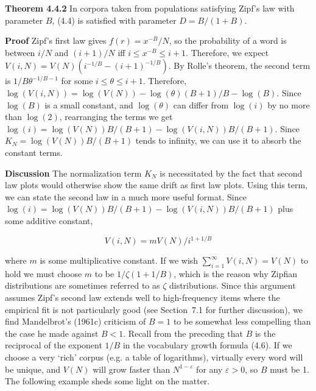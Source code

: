 \noindent
{\bf Theorem 4.4.2} In corpora taken from populations satisfying Zipf's law
with parameter $B$, (4.4) is satisfied with parameter $D=B/(1+B)$.

\smallskip
\noindent
{\bf Proof} Zipf's first law gives $f(r)=x^{-B}/N$, so the probability of a
word is between $i/N$ and $(i+1)/N$ iff $i \leq x^{-B} \leq i+1$. Therefore, we
expect $V(i,N) = V(N)(i^{-1/B } - (i+1)^{-1/B })$. By Rolle's theorem, the
second term is $1/B \theta^{-1/B -1}$ for some $i \leq \theta \leq
i+1$. Therefore, $\log(V(i,N)) = \log(V(N)) - \log(\theta)(B+1)/B -\log(B)$.
Since $\log(B)$ is a small constant, and $\log(\theta)$ can differ from
$\log(i)$ by no more than $\log(2)$, rearranging the terms we get $ \log(i) =
\log(V(N)) B/(B+1) - \log(V(i,N)) B/(B +1)$. Since $K_N = \log(V(N))B/(B+1)$
tends to infinity, we can use it to absorb the constant terms.

\smallskip
\noindent
{\bf Discussion} The normalization term $K_N$ is necessitated by the fact that
second law plots would otherwise show the same drift as first law plots. Using
this term, we can state the second law in a much more useful format. Since
$\log(i) = \log(V(N)) B/(B +1) - \log(V(i,N)) B/(B +1)$ plus some additive
constant,

\begin{equation} %
V(i,N) = mV(N)/i^{1+1/B}
\end{equation}

\noindent
where $m$ is some multiplicative constant.  If we wish $\sum_{i=1}^{\infty}
V(i,N) = V(N)$ to hold we must choose $m$ to be $1/\zeta(1+1/B)$, which is
the reason why Zipfian distributions are sometimes referred to as $\zeta$
distributions. Since this argument assumes Zipf's second law extends well to
high-frequency items where the empirical fit is not particularly good (see
Section~7.1 for further discussion), we find Mandelbrot's (1961c)
\nocite{Mandelbrot:1961} criticism of $B=1$ to be somewhat less compelling
than the case he made against $B<1$.  Recall from the preceding that $B$ is
the reciprocal of the exponent $1/B $ in the vocabulary growth formula
(4.6). If we choose a very `rich' corpus (e.g. a table of logarithms),
virtually every word will be unique, and $V(N)$ will grow faster than
$N^{1-\varepsilon}$ for any $\varepsilon > 0$, so $B$ must be 1. The following
example sheds some light on the matter.

